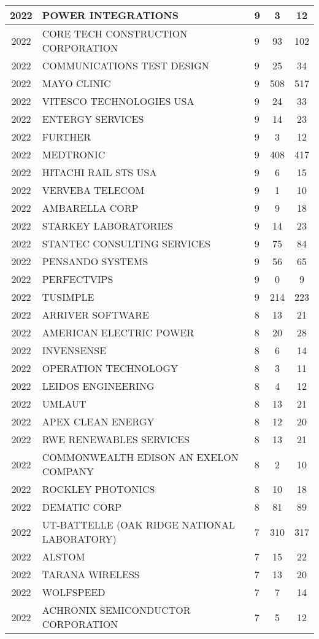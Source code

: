 \documentclass{article}%
\begin{document}
\begin{longtable}{c|p{20em}|p{5em}|c|c}
2022&POWER INTEGRATIONS&9&3&12\\%
\hline%
2022&CORE TECH CONSTRUCTION CORPORATION&9&93&102\\%
\hline%
2022&COMMUNICATIONS TEST DESIGN&9&25&34\\%
\hline%
2022&MAYO CLINIC&9&508&517\\%
\hline%
2022&VITESCO TECHNOLOGIES USA&9&24&33\\%
\hline%
2022&ENTERGY SERVICES&9&14&23\\%
\hline%
2022&FURTHER&9&3&12\\%
\hline%
2022&MEDTRONIC&9&408&417\\%
\hline%
2022&HITACHI RAIL STS USA&9&6&15\\%
\hline%
2022&VERVEBA TELECOM&9&1&10\\%
\hline%
2022&AMBARELLA CORP&9&9&18\\%
\hline%
2022&STARKEY LABORATORIES&9&14&23\\%
\hline%
2022&STANTEC CONSULTING SERVICES&9&75&84\\%
\hline%
2022&PENSANDO SYSTEMS&9&56&65\\%
\hline%
2022&PERFECTVIPS&9&0&9\\%
\hline%
2022&TUSIMPLE&9&214&223\\%
\hline%
2022&ARRIVER SOFTWARE&8&13&21\\%
\hline%
2022&AMERICAN ELECTRIC POWER&8&20&28\\%
\hline%
2022&INVENSENSE&8&6&14\\%
\hline%
2022&OPERATION TECHNOLOGY&8&3&11\\%
\hline%
2022&LEIDOS ENGINEERING&8&4&12\\%
\hline%
2022&UMLAUT&8&13&21\\%
\hline%
2022&APEX CLEAN ENERGY&8&12&20\\%
\hline%
2022&RWE RENEWABLES SERVICES&8&13&21\\%
\hline%
2022&COMMONWEALTH EDISON AN EXELON COMPANY&8&2&10\\%
\hline%
2022&ROCKLEY PHOTONICS&8&10&18\\%
\hline%
2022&DEMATIC CORP&8&81&89\\%
\hline%
2022&UT{-}BATTELLE  (OAK RIDGE NATIONAL LABORATORY)&7&310&317\\%
\hline%
2022&ALSTOM&7&15&22\\%
\hline%
2022&TARANA WIRELESS&7&13&20\\%
\hline%
2022&WOLFSPEED&7&7&14\\%
\hline%
2022&ACHRONIX SEMICONDUCTOR CORPORATION&7&5&12\\%

\end{longtable}
\end{document}
